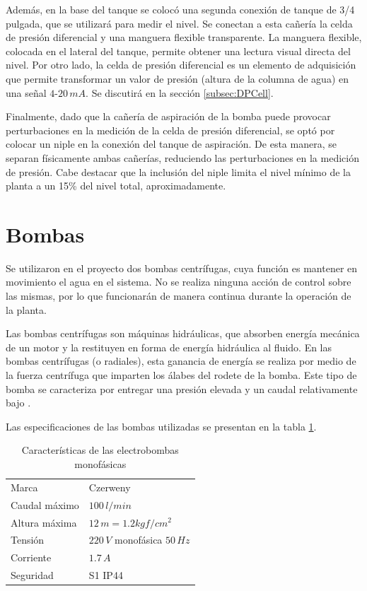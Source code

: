 Además, en la base del tanque se colocó una segunda conexión de tanque de 3/4
pulgada, que se utilizará para medir el nivel.
Se conectan a esta cañería la celda de presión diferencial y una manguera
flexible transparente.
La manguera flexible, colocada en el lateral del tanque, permite obtener una
lectura visual directa del nivel.
Por otro lado, la celda de presión diferencial es un elemento de adquisición
que permite transformar un valor de presión (altura de la columna de agua) en
una señal $4$-$20\,mA$.
Se discutirá en la sección \ref{subsec:DPCell}.

Finalmente, dado que la cañería de aspiración de la bomba puede provocar
perturbaciones en la medición de la celda de presión diferencial, se optó por
colocar un niple en la conexión del tanque de aspiración.
De esta manera, se separan físicamente ambas cañerías, reduciendo las
perturbaciones en la medición de presión.
Cabe destacar que la inclusión del niple limita el nivel mínimo de la planta a
un 15\% del nivel total, aproximadamente.

\section{Bombas}
\label{sec:Bombas}

Se utilizaron en el proyecto dos bombas centrífugas, cuya función es
mantener en movimiento el agua en el sistema.
No se realiza ninguna acción de control sobre las
mismas, por lo que funcionarán de manera continua durante la operación de la
planta.

Las bombas centrífugas son máquinas hidráulicas, que absorben energía mecánica
de un motor y la restituyen en forma de energía hidráulica al fluido.
En las bombas centrífugas (o radiales), esta ganancia de energía se realiza por
medio de la fuerza centrífuga que imparten los álabes del rodete de la bomba.
Este tipo de bomba se caracteriza por entregar una presión elevada y un caudal
relativamente bajo \cite{bib:Mataix}.

Las especificaciones de las bombas utilizadas se presentan en la tabla
\ref{tab:caractBombas}.

\begin{table}[t]
\centering
\begin{tabular}{|l|l|}
\hline
Marca & Czerweny\\
Caudal máximo &  $100\,l/min$\\
Altura máxima &  $12\,m = 1.2 kgf/cm^2$\\
Tensión & $220\,V$ monofásica $50\,Hz$\\
Corriente & $1.7\,A$\\
Seguridad & S1 IP44\\
\hline
\end{tabular}
\caption{Características de las electrobombas monofásicas}
\label{tab:caractBombas}
\end{table}

